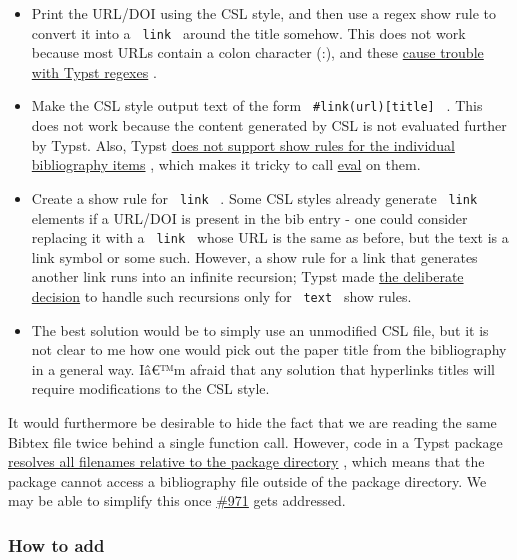 \begin{itemize}
\tightlist
\item
  Print the URL/DOI using the CSL style, and then use a regex show rule
  to convert it into a \texttt{\ link\ } around the title somehow. This
  does not work because most URLs contain a colon character (:), and
  these \href{https://github.com/typst/typst/issues/86}{cause trouble
  with Typst regexes} .
\item
  Make the CSL style output text of the form
  \texttt{\ \#link(url){[}title{]}\ } . This does not work because the
  content generated by CSL is not evaluated further by Typst. Also,
  Typst \href{https://github.com/typst/typst/issues/942}{does not
  support show rules for the individual bibliography items} , which
  makes it tricky to call
  \href{https://typst.app/docs/reference/foundations/eval/}{eval} on
  them.
\item
  Create a show rule for \texttt{\ link\ } . Some CSL styles already
  generate \texttt{\ link\ } elements if a URL/DOI is present in the bib
  entry - one could consider replacing it with a \texttt{\ link\ } whose
  URL is the same as before, but the text is a link symbol or some such.
  However, a show rule for a link that generates another link runs into
  an infinite recursion; Typst made
  \href{https://github.com/typst/typst/pull/3327}{the deliberate
  decision} to handle such recursions only for \texttt{\ text\ } show
  rules.
\item
  The best solution would be to simply use an unmodified CSL file, but
  it is not clear to me how one would pick out the paper title from the
  bibliography in a general way. Iâ€™m afraid that any solution that
  hyperlinks titles will require modifications to the CSL style.
\end{itemize}

It would furthermore be desirable to hide the fact that we are reading
the same Bibtex file twice behind a single function call. However, code
in a Typst package
\href{https://github.com/typst/typst/issues/2126}{resolves all filenames
relative to the package directory} , which means that the package cannot
access a bibliography file outside of the package directory. We may be
able to simplify this once
\href{https://github.com/typst/typst/issues/971}{\#971} gets addressed.

\subsubsection{How to add}\label{how-to-add}

